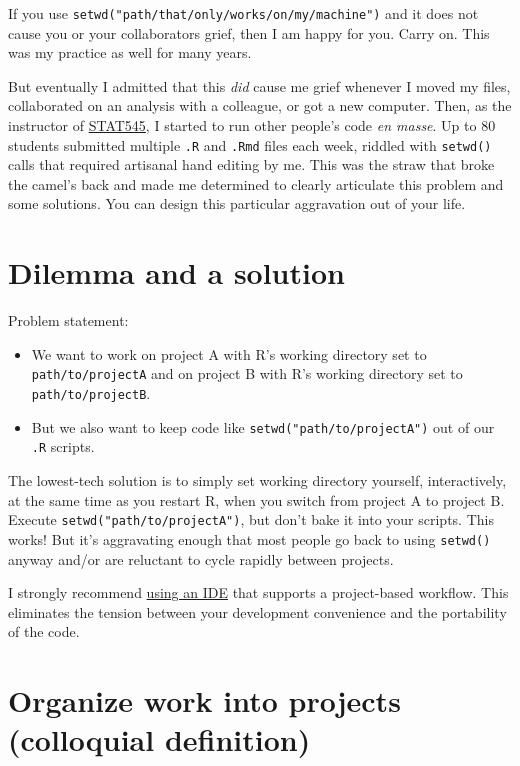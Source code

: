 \documentclass[
  letterpaper,
]{book}
\providecommand{\tightlist}{%
  \setlength{\itemsep}{0pt}\setlength{\parskip}{0pt}}\usepackage{longtable,booktabs,array}
\begin{document}
If you use \texttt{setwd("path/that/only/works/on/my/machine")} and it
does not cause you or your collaborators grief, then I am happy for you.
Carry on. This was my practice as well for many years.

But eventually I admitted that this \emph{did} cause me grief whenever I
moved my files, collaborated on an analysis with a colleague, or got a
new computer. Then, as the instructor of
\href{http://stat545.com}{STAT545}, I started to run other people's code
\emph{en masse}. Up to 80 students submitted multiple \texttt{.R} and
\texttt{.Rmd} files each week, riddled with \texttt{setwd()} calls that
required artisanal hand editing by me. This was the straw that broke the
camel's back and made me determined to clearly articulate this problem
and some solutions. You can design this particular aggravation out of
your life.

\hypertarget{dilemma-and-a-solution}{%
\section{Dilemma and a solution}\label{dilemma-and-a-solution}}

Problem statement:

\begin{itemize}
\tightlist
\item
  We want to work on project A with R's working directory set to
  \texttt{path/to/projectA} and on project B with R's working directory
  set to \texttt{path/to/projectB}.
\item
  But we also want to keep code like \texttt{setwd("path/to/projectA")}
  out of our \texttt{.R} scripts.
\end{itemize}

The lowest-tech solution is to simply set working directory yourself,
interactively, at the same time as you restart R, when you switch from
project A to project B. Execute \texttt{setwd("path/to/projectA")}, but
don't bake it into your scripts. This works! But it's aggravating enough
that most people go back to using \texttt{setwd()} anyway and/or are
reluctant to cycle rapidly between projects.

I strongly recommend \protect\hyperlink{use-an-ide}{using an IDE} that
supports a project-based workflow. This eliminates the tension between
your development convenience and the portability of the code.

\hypertarget{work-in-a-project}{%
\section{Organize work into projects (colloquial
definition)}\label{work-in-a-project}}
\end{document}
